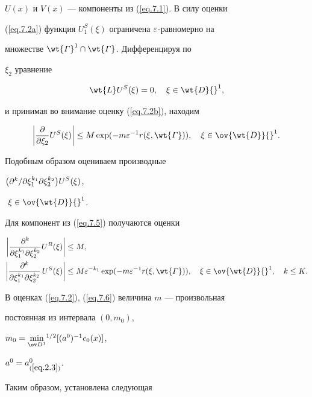 $U(x)$ и $V(x)$ --- компоненты из (\ref{eq.7.1}). В силу оценки


(\ref{eq.7.2a}) функция $U_1^S(\xi)$ ограничена $\varepsilon$-равномерно на


множестве $\wt{\varGamma}^1\cap \wt{\varGamma}$. Дифференцируя по


$\xi_2$ уравнение


$$


\wt{L} U^S(\xi)=0, \quad \xi\in \wt{D}{}^1,


$$


и принимая во внимание оценку (\ref{eq.7.2b}), находим


$$


\bigg|\frac{\pa}{\pa \xi_{2}}U^S(\xi)\bigg|\leq


M\exp(-m\eps^{-1}r(\xi,\wt{\varGamma})),\quad \xi\in \ov{\wt{D}}{}^1.


$$


Подобным образом оцениваем производные


$\big(\partial^k/\displaystyle\partial \xi_{ 1}^{k_1}\displaystyle\partial \xi_{ 2}^{k_2}\big)U^S(\xi)$,


$~\xi\in \ov{\wt{D}}{}^1$.





Для компонент из (\ref{eq.7.5}) получаются оценки


\begin{align}\label{eq.7.6}


\bigg|\frac{\pa^k}{\pa \xi_{ 1}^{k_1}\pa \xi_{ 2}^{k_2}}U^R(\xi)


\bigg|&\leq M, \\


\bigg|\frac{\pa^k}{\pa \xi_{ 1}^{k_1}\pa \xi_{ 2}^{k_2}}\,U^S(\xi)


\bigg|&\leq M\eps^{-k_1}\exp(-m\eps^{-1}


r(\xi,\wt{\varGamma})),\quad \xi\in \ov{\wt{D}}{}^1,\quad k\leq K. \notag


\end{align}


В оценках (\ref{eq.7.2}), (\ref{eq.7.6}) величина $m$ --- произвольная


постоянная из интервала $(0,m_0)$,


$m_0={\min\limits_{\od{}^1}}^{1/2}[(a^0)^{-1}c_0(x)]$,


$a^0=a^0_{(\ref{eq.2.3})}$.





Таким образом, установлена следующая





